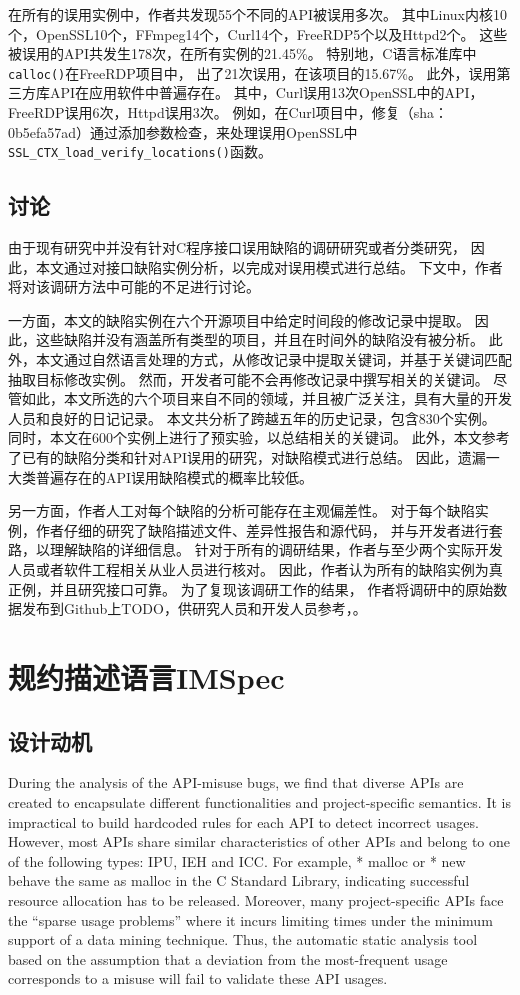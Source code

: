 在所有的误用实例中，作者共发现55个不同的API被误用多次。
其中Linux内核10个，OpenSSL10个，FFmpeg14个，Curl14个，FreeRDP5个以及Httpd2个。
这些被误用的API共发生178次，在所有实例的21.45\%。
特别地，C语言标准库中\texttt{calloc()}在FreeRDP项目中，
出了21次误用，在该项目的15.67\%。
此外，误用第三方库API在应用软件中普遍存在。
其中，Curl误用13次OpenSSL中的API，FreeRDP误用6次，Httpd误用3次。
例如，在Curl项目中，修复（sha：0b5efa57ad）通过添加参数检查，来处理误用OpenSSL中
\texttt{SSL\_CTX\_load\_verify\_locations()}函数。


\subsection{讨论}
由于现有研究中并没有针对C程序接口误用缺陷的调研研究或者分类研究，
因此，本文通过对接口缺陷实例分析，以完成对误用模式进行总结。
下文中，作者将对该调研方法中可能的不足进行讨论。

一方面，本文的缺陷实例在六个开源项目中给定时间段的修改记录中提取。
因此，这些缺陷并没有涵盖所有类型的项目，并且在时间外的缺陷没有被分析。
此外，本文通过自然语言处理的方式，从修改记录中提取关键词，并基于关键词匹配抽取目标修改实例。
然而，开发者可能不会再修改记录中撰写相关的关键词。
尽管如此，本文所选的六个项目来自不同的领域，并且被广泛关注，具有大量的开发人员和良好的日记记录。
本文共分析了跨越五年的历史记录，包含830个实例。
同时，本文在600个实例上进行了预实验，以总结相关的关键词。
此外，本文参考了已有的缺陷分类和针对API误用的研究，对缺陷模式进行总结。
因此，遗漏一大类普遍存在的API误用缺陷模式的概率比较低。

另一方面，作者人工对每个缺陷的分析可能存在主观偏差性。
对于每个缺陷实例，作者仔细的研究了缺陷描述文件、差异性报告和源代码，
并与开发者进行套路，以理解缺陷的详细信息。
针对于所有的调研结果，作者与至少两个实际开发人员或者软件工程相关从业人员进行核对。
因此，作者认为所有的缺陷实例为真正例，并且研究接口可靠。
为了复现该调研工作的结果，
作者将调研中的原始数据发布到Github上TODO，供研究人员和开发人员参考，。

\section{规约描述语言IMSpec}
\label{sec:2.4}
\subsection{设计动机}
During the analysis of the API-misuse bugs, we find that
diverse APIs are created to encapsulate different functionalities
and project-specific semantics. It is impractical to build hardcoded
rules for each API to detect incorrect usages. However,
most APIs share similar characteristics of other APIs and
belong to one of the following types: IPU, IEH and ICC. For
example, * malloc or * new behave the same as malloc in the
C Standard Library, indicating successful resource allocation
has to be released. Moreover, many project-specific APIs face
the “sparse usage problems” where it incurs limiting times
under the minimum support of a data mining technique. Thus,
the automatic static analysis tool based on the assumption that
a deviation from the most-frequent usage corresponds to a
misuse will fail to validate these API usages.

